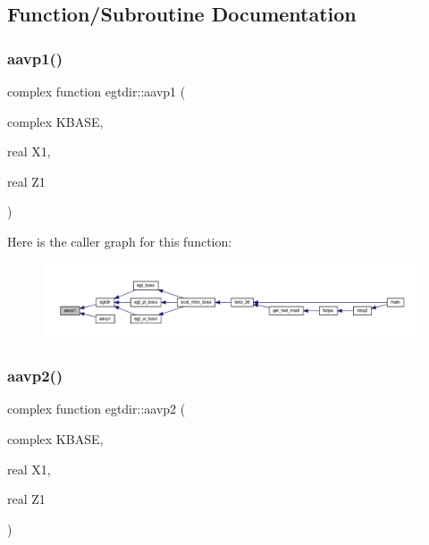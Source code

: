 \subsection{Function/\+Subroutine Documentation}
\mbox{\label{Leroi_8f90_a2d69cada9a1fff81caa02d919be5ce7c}} 
\subsubsection{\texorpdfstring{aavp1()}{aavp1()}}
{\footnotesize\ttfamily complex function egtdir\+::aavp1 (\begin{DoxyParamCaption}\item[{complex}]{K\+B\+A\+SE,  }\item[{real}]{X1,  }\item[{real}]{Z1 }\end{DoxyParamCaption})}

Here is the caller graph for this function\+:\nopagebreak
\begin{figure}[H]
\begin{center}
\leavevmode
\includegraphics[width=350pt]{Leroi_8f90_a2d69cada9a1fff81caa02d919be5ce7c_icgraph}
\end{center}
\end{figure}
\mbox{\label{Leroi_8f90_afeabf8ee47c9628f00ed2dfa98f56e40}} 
\subsubsection{\texorpdfstring{aavp2()}{aavp2()}}
{\footnotesize\ttfamily complex function egtdir\+::aavp2 (\begin{DoxyParamCaption}\item[{complex}]{K\+B\+A\+SE,  }\item[{real}]{X1,  }\item[{real}]{Z1 }\end{DoxyParamCaption})}

